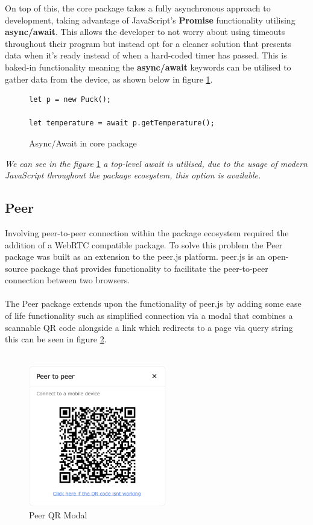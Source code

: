 \documentclass{l4proj}
\begin{document}
On top of this, the core package takes a fully asynchronous approach to development, taking advantage of JavaScript's \textbf{Promise} functionality utilising \textbf{async/await}. This allows the developer to not worry about using timeouts throughout their program but instead opt for a cleaner solution that presents data when it's ready instead of when a hard-coded timer has passed. This is baked-in functionality meaning the \textbf{async/await} keywords can be utilised to gather data from the device, as shown below in figure \ref{fig:async-await-core}.

\begin{figure}[!ht]
    \centering
    \begin{lstlisting}
let p = new Puck();

let temperature = await p.getTemperature();
    \end{lstlisting}
    \caption{Async/Await in core package}
    \label{fig:async-await-core}
\end{figure}

\textit{We can see in the figure }\ref{fig:async-await-core} \textit{a top-level await is utilised, due to the usage of modern JavaScript throughout the package ecosystem, this option is available.}

\subsection{Peer}
\text Involving peer-to-peer connection within the package ecosystem required the addition of a WebRTC compatible package. To solve this problem the Peer package was built as an extension to the peer.js platform. peer.js is an open-source package that provides functionality to facilitate the peer-to-peer connection between two browsers. 
\\ \\
The Peer package extends upon the functionality of peer.js by adding some ease of life functionality such as simplified connection via a modal that combines a scannable QR code alongside a link which redirects to a page via query string this can be seen in figure \ref{fig:qr-scan}. 
\\ \\
\begin{figure}[!ht]
    \centering
    \includegraphics[width=6cm]{dissertation/images/QR-p2p-modal.png}
    \caption{Peer QR Modal}
    \label{fig:qr-scan}
\end{figure}
\end{document}
